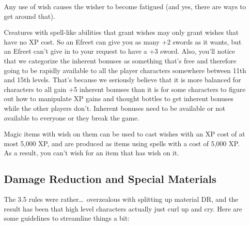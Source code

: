 Any use of wish causes the wisher to become fatigued (and yes, there are ways to get around that).

Creatures with spell-like abilities that grant wishes may only grant wishes that have no XP cost. So an Efreet can give you as many +2 swords as it wants, but an Efreet can't give in to your request to have a +3 sword. Also, you'll notice that we categorize the inherent bonuses as something that's free and therefore going to be rapidly available to all the player characters somewhere between 11th and 15th levels. That's because we seriously believe that it is more balanced for characters to all gain +5 inherent bonuses than it is for some characters to figure out how to manipulate XP gains and thought bottles to get inherent bonuses while the other players don't. Inherent bonuses need to be available or not available to everyone or they break the game.

Magic items with wish on them can be used to cast wishes with an XP cost of at most 5,000 XP, and are produced as items using spells with a cost of 5,000 XP. As a result, you can't wish for an item that has wish on it.

\subsection{Damage Reduction and Special Materials}

The 3.5 rules were rather\ldots\  overzealous with splitting up material DR, and the result has been that high level characters actually just curl up and cry. Here are some guidelines to streamline things a bit:

